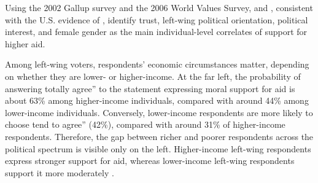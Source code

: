
Using the 2002 Gallup survey and the 2006 World Values Survey, \citet{bayram_aiding_2017} and \citet{paxton_individual_2012}, consistent with the U.S. evidence of \citet{heinrich_voters_2018}, identify trust, left-wing political orientation, political interest, and female gender as the main individual-level correlates of support for higher aid.

Among left-wing voters, respondents’ economic circumstances matter, depending on whether they are lower- or higher-income. At the far left, the probability of answering totally agree'' to the statement expressing moral support for aid is about 63\% among higher-income individuals, compared with around 44\% among lower-income individuals. Conversely, lower-income respondents are more likely to choose tend to agree'' (42\%), compared with around 31\% of higher-income respondents. Therefore, the gap between richer and poorer respondents across the political spectrum is visible only on the left. Higher-income left-wing respondents express stronger support for aid, whereas lower-income left-wing respondents support it more moderately \citep{cho_ideology_2024}.